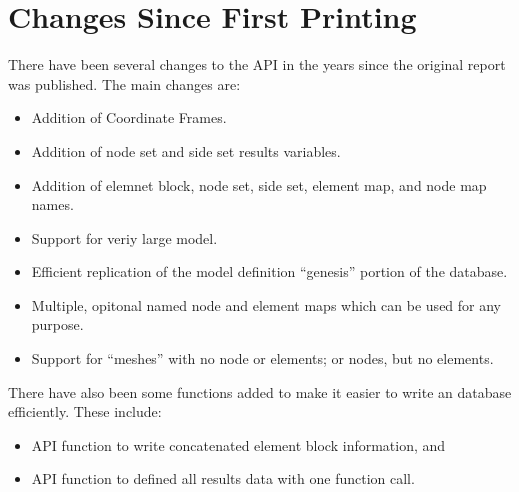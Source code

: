 \chapter{Changes Since First Printing}
There have been several changes to the \exo{} API in the years since
the original \exo{} report was published.  The main changes are:
\begin{itemize}
\item Addition of Coordinate Frames.
\item Addition of node set and side set results variables.
\item Addition of elemnet block, node set, side set, element map, and
node map names.
\item Support for veriy large model.
\item Efficient replication of the model definition ``genesis''
portion of the database.
\item Multiple, opitonal named node and element maps which can be used
for any purpose.
\item Support for ``meshes'' with no node or elements; or nodes, but
no elements.
\end{itemize}

There have also been some functions added to make it easier to write
an \exo{} database efficiently.  These include:
\begin{itemize}
\item API function to write concatenated element block information,
and
\item API function to defined all results data with one function call.
\end{itemize}
